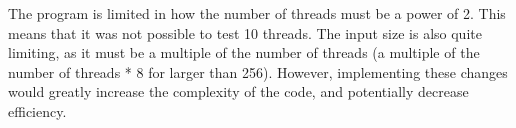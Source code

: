 \documentclass[11pt, oneside]{article}
\begin{document}
The program is limited in how the number of threads must be a power of 2. This means that it was not possible to test 10 threads. The input size is also quite limiting, as it must be a multiple of the number of threads (a multiple of the number of threads * 8 for larger than 256). However, implementing these changes would greatly increase the complexity of the code, and potentially decrease efficiency.





\end{document}

